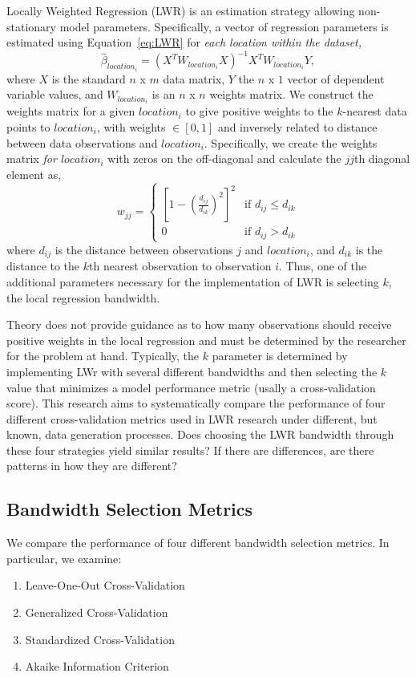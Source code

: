 \documentclass{article}\usepackage{graphicx, color}
\begin{document}
Locally Weighted Regression (LWR) is an estimation strategy allowing non-stationary model parameters. Specifically, a vector of regression parameters is estimated using Equation~\eqref{eq:LWR} for \emph{each location within the dataset,} 
\begin{equation}\label{eq:LWR}
\hat{\beta}_{location_i} =(X^TW_{location_i}X)^{-1}X^TW_{location_i}Y,
\end{equation}
where $X$ is the standard $n$ x $m$ data matrix, $Y$ the $n$ x $1$ vector of dependent variable values, and $W_{location_i}$ is an $n$ x $n$ weights matrix. We construct the weights matrix for a given $location_i$ to give positive weights to the $k$-nearest data points to $location_i$, with weights $\in [0, 1]$ and inversely related to distance between data observations and $location_i$.  Specifically, we create the weights matrix \emph{for $location_i$} with zeros on the off-diagonal and calculate the $jj$th diagonal element as,
\begin{equation}\label{eq:bisquare}
w_{jj}= 
\begin{cases} \left[1-\left(\frac{d_{ij}}{d_{ik}}\right)^2\right]^2 & \text{if $d_{ij}\leq d_{ik}$} \\
0 &\text{if $d_{ij} > d_{ik}$}
\end{cases}
\end{equation}
where $d_{ij}$ is the distance between observations $j$ and $location_i$, and $d_{ik}$ is the distance to the $k$th nearest observation to observation $i$. Thus, one of the additional parameters necessary for the implementation of LWR is selecting $k$, the local regression bandwidth. 

Theory does not provide guidance as to how many observations should receive positive weights in the local regression and must be determined by the researcher for the problem at hand. Typically, the $k$ parameter is determined by implementing LWr with several different bandwidths and then selecting the $k$ value that minimizes a model performance metric (usally a cross-validation score). This research aims to systematically compare the performance of four different cross-validation metrics used in LWR research under different, but known, data generation processes. Does choosing the LWR bandwidth through these four strategies yield similar results? If there are differences, are there patterns in how they are different?

\subsection{Bandwidth Selection Metrics}
We compare the performance of four different bandwidth selection metrics. In particular, we examine:
\begin{enumerate}
\item Leave-One-Out Cross-Validation
\item Generalized Cross-Validation 
\item Standardized Cross-Validation
\item Akaike Information Criterion
\end{enumerate}
\end{document}
